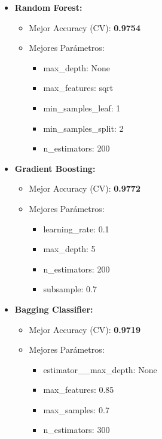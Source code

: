 \documentclass[a4paper,12pt]{article}
\begin{document}
\begin{itemize}
    \item \textbf{Random Forest:}
          \begin{itemize}
              \item Mejor Accuracy (CV): \textbf{0.9754}
              \item Mejores Parámetros:
                    \begin{itemize}
                        \item max\_depth: None
                        \item max\_features: sqrt
                        \item min\_samples\_leaf: 1
                        \item min\_samples\_split: 2
                        \item n\_estimators: 200
                    \end{itemize}
          \end{itemize}
    \item \textbf{Gradient Boosting:}
          \begin{itemize}
              \item Mejor Accuracy (CV): \textbf{0.9772}
              \item Mejores Parámetros:
                    \begin{itemize}
                        \item learning\_rate: 0.1
                        \item max\_depth: 5
                        \item n\_estimators: 200
                        \item subsample: 0.7
                    \end{itemize}
          \end{itemize}
    \item \textbf{Bagging Classifier:}
          \begin{itemize}
              \item Mejor Accuracy (CV): \textbf{0.9719}
              \item Mejores Parámetros:
                    \begin{itemize}
                        \item estimator\_\_max\_depth: None
                        \item max\_features: 0.85
                        \item max\_samples: 0.7
                        \item n\_estimators: 300
                    \end{itemize}
          \end{itemize}
\end{itemize}
\end{document}
